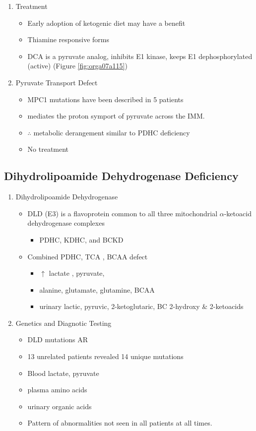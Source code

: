 \documentclass{scrartcl}
\begin{document}
\begin{enumerate}
\item Treatment
\label{sec:org40e1317}
\begin{itemize}
\item Early adoption of ketogenic diet may have a benefit
\item Thiamine responsive forms
\item DCA is a pyruvate analog, inhibits E1 kinase, keeps E1 dephosphorylated (active) (Figure \ref{fig:orga07a115})
\end{itemize}

\item Pyruvate Transport Defect
\label{sec:org5cb34e2}
\begin{itemize}
\item MPC1 mutations have been described in 5 patients
\item mediates the proton symport of pyruvate across the IMM.
\item \(\therefore\) metabolic derangement similar to PDHC deficiency
\item No treatment
\end{itemize}
\end{enumerate}

\subsection{Dihydrolipoamide Dehydrogenase Deficiency}
\label{sec:org97880fb}
\begin{enumerate}
\item Dihydrolipoamide Dehydrogenase
\label{sec:org0571d0d}
\begin{itemize}
\item DLD (E3) is a flavoprotein common to all three mitochondrial
\(\alpha\)-ketoacid dehydrogenase complexes
\begin{itemize}
\item PDHC, KDHC, and BCKD
\end{itemize}
\item Combined PDHC, TCA , BCAA defect
\begin{itemize}
\item \(\uparrow\) lactate , pyruvate,
\item alanine, glutamate, glutamine, BCAA
\item urinary lactic, pyruvic, 2-ketoglutaric, BC 2-hydroxy \& 2-ketoacids
\end{itemize}
\end{itemize}

\item Genetics and Diagnotic Testing
\label{sec:org41c76ca}
\begin{itemize}
\item DLD mutations AR
\item 13 unrelated patients revealed 14 unique mutations
\item Blood lactate, pyruvate
\item plasma amino acids
\item urinary organic acids
\item Pattern of abnormalities not seen in all patients at all times.
\end{itemize}
\end{enumerate}
\end{document}

